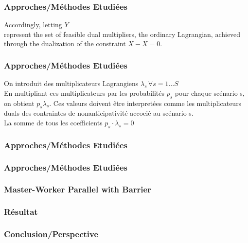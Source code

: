 \documentclass[10pt]{beamer}
\begin{document}
    \begin{frame}
        \frametitle{Approches/Méthodes Etudiées}
        Accordingly, letting $Y$\\ %
        represent the set of feasible dual multipliers, the ordinary Lagrangian, achieved through the dualization
of the constraint $X - X = 0$.
    \end{frame}
    
    
    \begin{frame}
        \frametitle{Approches/Méthodes Etudiées}
        On introduit des multiplicateurs Lagrangiens $\lambda_s \, \forall s = 1 \ldots S$\\
        En multipliant ces multiplicateurs par les probabilités $p_s$ pour chaque scénario s, on obtient $p_s\lambda_s$. Ces valeurs doivent être interpretées comme les multiplicateurs duals des contraintes de nonanticipativité accocié au scénario s.\\
        La somme de tous les coefficients $p_s\cdot\lambda_s = 0$
    \end{frame}
    
    \begin{frame}
        \frametitle{Approches/Méthodes Etudiées}
    \end{frame}
    
    \begin{frame}
        \frametitle{Approches/Méthodes Etudiées}
        
    \end{frame}
    
    \begin{frame}
        \frametitle{Master-Worker Parallel with Barrier}            
    \end{frame}
        
    \begin{frame}
        \frametitle{Résultat}
    \end{frame}
        
    \begin{frame}
        \frametitle{Conclusion/Perspective}
    \end{frame}
    
    \iffalse
    \fi
\end{document}
